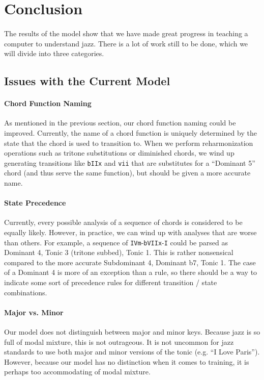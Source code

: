 \documentclass[]{article}
\begin{document}
\section{Conclusion}
\paragraph{}
The results of the model show that we have made great progress in teaching a computer to understand jazz.  There is a lot of work still to be done, which we will divide into three categories.

\subsection{Issues with the Current Model}
\paragraph{Chord Function Naming} As mentioned in the previous section, our chord function naming could be improved.  Currently, the name of a chord function is uniquely determined by the state that the chord is used to transition to.  When we perform reharmonization operations such as tritone substitutions or diminished chords, we wind up generating transitions like \texttt{bIIx} and \texttt{vii} that are substitutes for a ``Dominant 5'' chord (and thus serve the same function), but should be given a more accurate name.

\paragraph{State Precedence} Currently, every possible analysis of a sequence of chords is considered to be equally likely.  However, in practice, we can wind up with analyses that are worse than others.  For example, a sequence of \texttt{IVm}-\texttt{bVIIx}-\texttt{I} could be parsed as Dominant 4, Tonic 3 (tritone subbed), Tonic 1.  This is rather nonsensical compared to the more accurate Subdominant 4, Dominant b7, Tonic 1.  The case of a Dominant 4 is more of an exception than a rule, so there should be a way to indicate some sort of precedence rules for different transition / state combinations.

\paragraph{Major vs. Minor} Our model does not distinguish between major and minor keys.  Because jazz is so full of modal mixture, this is not outrageous.  It is not uncommon for jazz standards to use both major and minor versions of the tonic (e.g. ``I Love Paris'').  However, because our model has no distinction when it comes to training, it is perhaps too accommodating of modal mixture.
\end{document}
